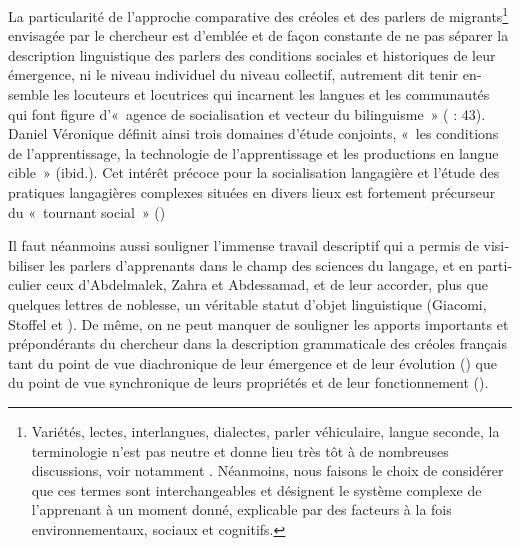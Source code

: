 \documentclass[output=paper]{langscibook}
\begin{document}
\begin{otherlanguage}{french}
La particularité de l’approche comparative des créoles et des parlers de migrants\footnote{Variétés, lectes, interlangues, dialectes, parler véhiculaire, langue seconde, la terminologie n’est pas neutre et donne lieu très tôt à de nombreuses discussions, voir notamment \citet{Véronique1980}. Néanmoins, nous faisons le choix de considérer que ces termes sont interchangeables et désignent le système complexe de l’apprenant à un moment donné, explicable par des facteurs à la fois environnementaux, sociaux et cognitifs.} envisagée par le chercheur est d’emblée et de façon constante de ne pas séparer la description linguistique des parlers des conditions sociales et historiques de leur émergence, ni le niveau individuel du niveau collectif, autrement dit tenir ensemble les locuteurs et locutrices qui incarnent les langues et les communautés qui font figure d’«~agence de socialisation et vecteur du bilinguisme~» (\citealt{Véronique1979} : 43). Daniel Véronique définit ainsi trois domaines d’étude conjoints, «~les conditions de l’apprentissage, la technologie de l’apprentissage et les productions en langue cible~» (ibid.). Cet intérêt précoce pour la socialisation langagière et l’étude des pratiques langagières complexes situées en divers lieux est fortement précurseur du «~tournant social~» (\citealt{Block2003,TheDouglasFirgroup2016}) 

Il faut néanmoins aussi souligner l’immense travail descriptif qui a permis de visibiliser les parlers d’apprenants dans le champ des sciences du langage, et en particulier ceux d’Abdelmalek, Zahra et Abdessamad, et de leur accorder, plus que quelques lettres de noblesse, un véritable statut d’objet linguistique (Giacomi, Stoffel et \citealt{Véronique2000,VéroniquePorquier1986c,Véronique1987,Véronique2009a,Véronique2010,Véronique2013d, Véronique2014b}). De même, on ne peut manquer de souligner les apports importants et prépondérants du chercheur dans la description grammaticale des créoles français tant du point de vue diachronique de leur émergence et de leur évolution (\citealt{Véronique1997b,Véronique1999,Véronique2000b,Véronique2003b,Véronique2007c,Véronique2007d,Véronique2012a,Véronique2013a,Véronique2013b,Véronique2014a,Véronique2017dynamique,Véronique2021d}) que du point de vue synchronique de leurs propriétés et de leur fonctionnement (\citealt{FonSingVéronique2007,Véronique1985,Véronique1986b,Véronique1992b,Véronique1993,Véronique1996,Véronique1997a,Véronique2000a,Véronique2001,Véronique2003a,Véronique2006,Véronique2007b,Véronique2009b,Véronique2012b,Véronique2013c,Véronique2013d,Véronique2020,Véronique2021c}).


\end{otherlanguage}
\end{document}
